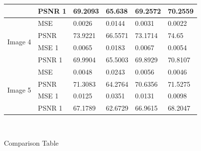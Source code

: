 \begin{center}
\begin{tabular}{|l|l|l|l|l|l|l|l|l|l|}
                         & PSNR 1 & \multicolumn{2}{l|}{69.2093} & \multicolumn{2}{l|}{65.638}  & \multicolumn{2}{l|}{69.2572}  & \multicolumn{2}{l|}{70.2559} \\ \hline
\multirow{4}{*}{Image 4} & MSE    & \multicolumn{2}{l|}{0.0026}  & \multicolumn{2}{l|}{0.0144}  & \multicolumn{2}{l|}{0.0031}   & \multicolumn{2}{l|}{0.0022}  \\ \cline{2-10} 
                         & PSNR   & \multicolumn{2}{l|}{73.9221} & \multicolumn{2}{l|}{66.5571} & \multicolumn{2}{l|}{73.1714}  & \multicolumn{2}{l|}{74.65}   \\ \cline{2-10} 
                         & MSE 1  & \multicolumn{2}{l|}{0.0065}  & \multicolumn{2}{l|}{0.0183}  & \multicolumn{2}{l|}{0.0067}   & \multicolumn{2}{l|}{0.0054}  \\ \cline{2-10} 
                         & PSNR 1 & \multicolumn{2}{l|}{69.9904} & \multicolumn{2}{l|}{65.5003} & \multicolumn{2}{l|}{69.8929}  & \multicolumn{2}{l|}{70.8107} \\ \hline
\multirow{4}{*}{Image 5} & MSE    & \multicolumn{2}{l|}{0.0048}  & \multicolumn{2}{l|}{0.0243}  & \multicolumn{2}{l|}{0.0056}   & \multicolumn{2}{l|}{0.0046}  \\ \cline{2-10} 
                         & PSNR   & \multicolumn{2}{l|}{71.3083} & \multicolumn{2}{l|}{64.2764} & \multicolumn{2}{l|}{70.6356}  & \multicolumn{2}{l|}{71.5275} \\ \cline{2-10} 
                         & MSE 1  & \multicolumn{2}{l|}{0.0125}  & \multicolumn{2}{l|}{0.0351}  & \multicolumn{2}{l|}{0.0131}   & \multicolumn{2}{l|}{0.0098}  \\ \cline{2-10} 
                         & PSNR 1 & \multicolumn{2}{l|}{67.1789} & \multicolumn{2}{l|}{62.6729} & \multicolumn{2}{l|}{66.9615}  & \multicolumn{2}{l|}{68.2047} \\ \hline
\end{tabular}

\

Comparison Table
\end{center}










\newpage
